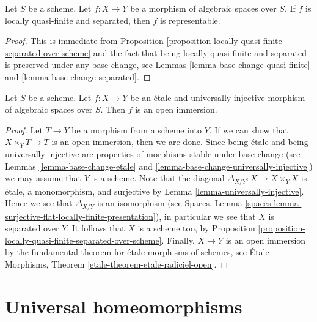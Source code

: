 \begin{lemma}
\label{lemma-locally-quasi-finite-separated-representable}
Let $S$ be a scheme. Let $f : X \to Y$ be a morphism of algebraic
spaces over $S$. If $f$ is locally quasi-finite and separated, then
$f$ is representable.
\end{lemma}

\begin{proof}
This is immediate from
Proposition \ref{proposition-locally-quasi-finite-separated-over-scheme}
and the fact that being locally quasi-finite and separated is
preserved under any base change, see
Lemmas \ref{lemma-base-change-quasi-finite} and
\ref{lemma-base-change-separated}.
\end{proof}

\begin{lemma}
\label{lemma-etale-universally-injective-open}
Let $S$ be a scheme. Let $f : X \to Y$ be an \'etale and universally
injective morphism of algebraic spaces over $S$. Then $f$ is an open
immersion.
\end{lemma}

\begin{proof}
Let $T \to Y$ be a morphism from a scheme into $Y$.
If we can show that $X \times_Y T \to T$ is an open immersion, then we
are done. Since being \'etale and being universally injective are
properties of morphisms stable under base change (see
Lemmas \ref{lemma-base-change-etale} and
\ref{lemma-base-change-universally-injective})
we may assume that $Y$ is a scheme. Note that the
diagonal $\Delta_{X/Y} : X \to X \times_Y X$ is \'etale, a monomorphism, and
surjective by
Lemma \ref{lemma-universally-injective}.
Hence we see that $\Delta_{X/Y}$ is an isomorphism (see
Spaces, Lemma
\ref{spaces-lemma-surjective-flat-locally-finite-presentation}),
in particular we see that $X$ is separated over $Y$.
It follows that $X$ is a scheme too, by
Proposition \ref{proposition-locally-quasi-finite-separated-over-scheme}.
Finally, $X \to Y$ is an open immersion by the fundamental theorem
for \'etale morphisms of schemes, see
\'Etale Morphisms, Theorem \ref{etale-theorem-etale-radiciel-open}.
\end{proof}









\section{Universal homeomorphisms}
\label{section-universal-homeomorphisms}

